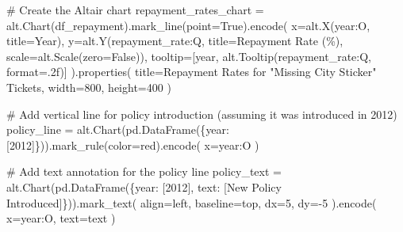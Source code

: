 \documentclass[
  letterpaper,
  DIV=11,
  numbers=noendperiod]{scrartcl}
\newenvironment{Shaded}{\begin{snugshade}}{\end{snugshade}}
\newcommand{\BuiltInTok}[1]{\textcolor[rgb]{0.00,0.23,0.31}{#1}}
\newcommand{\CommentTok}[1]{\textcolor[rgb]{0.37,0.37,0.37}{#1}}
\newcommand{\DecValTok}[1]{\textcolor[rgb]{0.68,0.00,0.00}{#1}}
\newcommand{\NormalTok}[1]{\textcolor[rgb]{0.00,0.23,0.31}{#1}}
\newcommand{\OperatorTok}[1]{\textcolor[rgb]{0.37,0.37,0.37}{#1}}
\newcommand{\StringTok}[1]{\textcolor[rgb]{0.13,0.47,0.30}{#1}}
\newcommand{\VariableTok}[1]{\textcolor[rgb]{0.07,0.07,0.07}{#1}}
\begin{document}
\begin{Shaded}
\begin{Highlighting}[]
\CommentTok{\# Create the Altair chart}
\NormalTok{repayment\_rates\_chart }\OperatorTok{=}\NormalTok{ alt.Chart(df\_repayment).mark\_line(point}\OperatorTok{=}\VariableTok{True}\NormalTok{).encode(}
\NormalTok{    x}\OperatorTok{=}\NormalTok{alt.X(}\StringTok{\textquotesingle{}year:O\textquotesingle{}}\NormalTok{, title}\OperatorTok{=}\StringTok{\textquotesingle{}Year\textquotesingle{}}\NormalTok{),}
\NormalTok{    y}\OperatorTok{=}\NormalTok{alt.Y(}\StringTok{\textquotesingle{}repayment\_rate:Q\textquotesingle{}}\NormalTok{, title}\OperatorTok{=}\StringTok{\textquotesingle{}Repayment Rate (\%)\textquotesingle{}}\NormalTok{, scale}\OperatorTok{=}\NormalTok{alt.Scale(zero}\OperatorTok{=}\VariableTok{False}\NormalTok{)),}
\NormalTok{    tooltip}\OperatorTok{=}\NormalTok{[}\StringTok{\textquotesingle{}year\textquotesingle{}}\NormalTok{, alt.Tooltip(}\StringTok{\textquotesingle{}repayment\_rate:Q\textquotesingle{}}\NormalTok{, }\BuiltInTok{format}\OperatorTok{=}\StringTok{\textquotesingle{}.2f\textquotesingle{}}\NormalTok{)]}
\NormalTok{).properties(}
\NormalTok{    title}\OperatorTok{=}\StringTok{\textquotesingle{}Repayment Rates for "Missing City Sticker" Tickets\textquotesingle{}}\NormalTok{,}
\NormalTok{    width}\OperatorTok{=}\DecValTok{800}\NormalTok{,}
\NormalTok{    height}\OperatorTok{=}\DecValTok{400}
\NormalTok{)}

\CommentTok{\# Add vertical line for policy introduction (assuming it was introduced in 2012)}
\NormalTok{policy\_line }\OperatorTok{=}\NormalTok{ alt.Chart(pd.DataFrame(\{}\StringTok{\textquotesingle{}year\textquotesingle{}}\NormalTok{: [}\DecValTok{2012}\NormalTok{]\})).mark\_rule(color}\OperatorTok{=}\StringTok{\textquotesingle{}red\textquotesingle{}}\NormalTok{).encode(}
\NormalTok{    x}\OperatorTok{=}\StringTok{\textquotesingle{}year:O\textquotesingle{}}
\NormalTok{)}

\CommentTok{\# Add text annotation for the policy line}
\NormalTok{policy\_text }\OperatorTok{=}\NormalTok{ alt.Chart(pd.DataFrame(\{}\StringTok{\textquotesingle{}year\textquotesingle{}}\NormalTok{: [}\DecValTok{2012}\NormalTok{], }\StringTok{\textquotesingle{}text\textquotesingle{}}\NormalTok{: [}\StringTok{\textquotesingle{}New Policy Introduced\textquotesingle{}}\NormalTok{]\})).mark\_text(}
\NormalTok{    align}\OperatorTok{=}\StringTok{\textquotesingle{}left\textquotesingle{}}\NormalTok{,}
\NormalTok{    baseline}\OperatorTok{=}\StringTok{\textquotesingle{}top\textquotesingle{}}\NormalTok{,}
\NormalTok{    dx}\OperatorTok{=}\DecValTok{5}\NormalTok{,}
\NormalTok{    dy}\OperatorTok{={-}}\DecValTok{5}
\NormalTok{).encode(}
\NormalTok{    x}\OperatorTok{=}\StringTok{\textquotesingle{}year:O\textquotesingle{}}\NormalTok{,}
\NormalTok{    text}\OperatorTok{=}\StringTok{\textquotesingle{}text\textquotesingle{}}
\NormalTok{)}


\end{Highlighting}
\end{Shaded}
\end{document}
